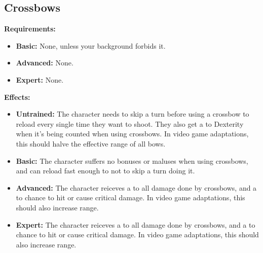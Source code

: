 \documentclass[openany,10pt,a4paper]{book}
\begin{document}
\subsection{Crossbows}
\begin{table}[!ht]
\centering
{}
\end{table}
\textbf{Requirements:}
\begin{itemize}
	\item \textbf{Basic:} None, unless your background forbids it.
	\item \textbf{Advanced:} None.
	\item \textbf{Expert:} None.
\end{itemize}
\textbf{Effects:}
\begin{itemize}
	\item \textbf{Untrained:} The character needs to skip a turn before using a crossbow to reload every single time they want to shoot. They also get a  to Dexterity when it's being counted when using crossbows. In video game adaptations, this should halve the effective range of all bows.
	\item \textbf{Basic:} The character suffers no bonuses or maluses when using crossbows, and can reload fast enough to not to skip a turn doing it.
	\item \textbf{Advanced:} The character reiceves a  to all damage done by crossbows, and a  to chance to hit or cause critical damage. In video game adaptations, this should also increase range.
	\item \textbf{Expert:} The character reiceves a  to all damage done by crossbows, and a  to chance to hit or cause critical damage. In video game adaptations, this should also increase range.
\end{itemize}\newpage
\end{document}
